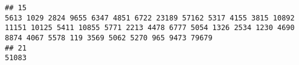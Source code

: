 \documentclass{article}\usepackage[]{graphicx}\usepackage[]{color}
\makeatletter
\newenvironment{kframe}{%
 \def\at@end@of@kframe{}%
 \ifinner\ifhmode%
  \def\at@end@of@kframe{\end{minipage}}%
  \begin{minipage}{\columnwidth}%
 \fi\fi%
 \def\FrameCommand##1{\hskip\@totalleftmargin \hskip-\fboxsep
 \colorbox{shadecolor}{##1}\hskip-\fboxsep
     \hskip-\linewidth \hskip-\@totalleftmargin \hskip\columnwidth}%
 \MakeFramed {\advance\hsize-\width
   \@totalleftmargin\z@ \linewidth\hsize
   \@setminipage}}%
 {\par\unskip\endMakeFramed%
 \at@end@of@kframe}
\newenvironment{knitrout}{}{} %
\makeatother
\begin{document}
\begin{knitrout}
\begin{kframe}
\begin{verbatim}
## 15                                                                                                                                                                                                                                                                                                                                                                                                                                                                                                                                                                                                                                                                                                                                                                                                                                                                                                                                                                                                                                                                                                                                                                                                                                                                                                       5613 1029 2824 9655 6347 4851 6722 23189 57162 5317 4155 3815 10892 11151 10125 5411 10855 5771 2213 4478 6777 5054 1326 2534 1230 4690 8874 4067 5578 119 3569 5062 5270 965 9473 79679
## 21                                                                                                                                                                                                                                                                                                                                                                                                                                                                                                                                                                                                                                                                                                                                                                                                                                                                                                                                                                                                                                                                                                                                                                                                                                                                                                                                                                                                                                                                                          51083

\end{verbatim}
\end{kframe}
\end{knitrout}
\end{document}
